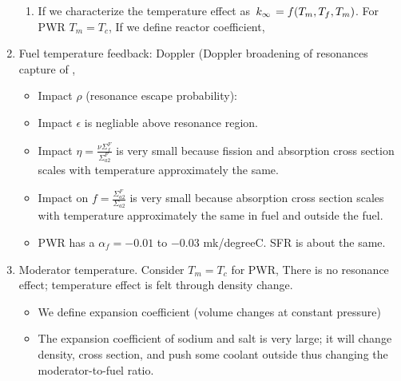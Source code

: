 \documentclass{school-22.211-notes}
\begin{document}
\begin{enumerate}
\begin{enumerate}
    \item If we characterize the temperature effect as $\left. k_{\infty} \right. = f(T_m, T_f, T_m)$. For PWR $T_m = T_c$, 
      If we define reactor coefficient, 
  \end{enumerate}

\item Fuel temperature feedback: Doppler (Doppler broadening of resonances capture of , 
      \begin{itemize}
      \item Impact $\rho$ (resonance escape probability): 
    \item Impact $\epsilon$ is negliable above resonance region. 
    \item Impact $\eta = \frac{\nu \Sigma_f^F}{\Sigma_{a2}^F}$ is very small because fission and absorption cross section scales with temperature approximately the same. 
    \item Impact on $f= \frac{\Sigma_{a2}^F}{\Sigma_{a2}}$ is very small because absorption cross section scales with temperature approximately the same in fuel and outside the fuel.
    \item PWR has a $\alpha_f = -0.01$ to $-0.03$ mk/degreeC. SFR is about the same. 
      \end{itemize}
      
    \item Moderator temperature. Consider $T_m = T_c$ for PWR, 
      There is no resonance effect; temperature effect is felt through density change. 
      \begin{itemize}
      \item We define expansion coefficient (volume changes at constant pressure) 

      \item The expansion coefficient of sodium and salt is very large; it will change density, cross section, and push some coolant outside thus changing the moderator-to-fuel ratio. 


\end{itemize}
\end{enumerate}
\end{document}

